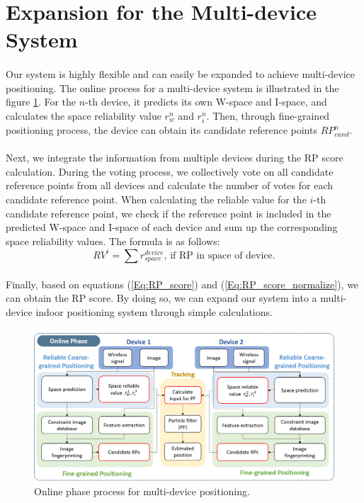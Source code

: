\documentclass[a4paper,12pt]{report}
\begin{document}
\section{Expansion for the Multi-device System}
\paragraph{}
Our system is highly flexible and can easily be expanded to achieve multi-device positioning. The online process for a multi-device system is illustrated in the figure \ref{Fig:multi_device}. For the $n$-th device, it predicts its own W-space and I-space, and calculates the space reliability value $r_w^n$ and $r_i^n$. Then, through fine-grained positioning process, the device can obtain its candidate reference points $RP_{cand}^n$.
\paragraph{}
Next, we integrate the information from multiple devices during the RP score calculation. During the voting process, we collectively vote on all candidate reference points from all devices and calculate the number of votes for each candidate reference point. When calculating the reliable value for the $i$-th candidate reference point, we check if the reference point is included in the predicted W-space and I-space of each device and sum up the corresponding space reliability values. The formula is as follows:
\begin{equation}
    \label{Eq:multi_device}
    RV^i=\sum{r_{space}^{device}} \text{, if RP in space of device.}
\end{equation}
\paragraph{}
Finally, based on equations (\ref{Eq:RP_score}) and (\ref{Eq:RP_score_normalize}), we can obtain the RP score. By doing so, we can expand our system into a multi-device indoor positioning system through simple calculations.
\paragraph{}
\begin{figure}[h]
    \centering
    \includegraphics[width=\columnwidth]{images/chap3/multi_device.png}
    \caption{Online phase process for multi-device positioning.}
    \label{Fig:multi_device}
\end{figure}
\end{document}
